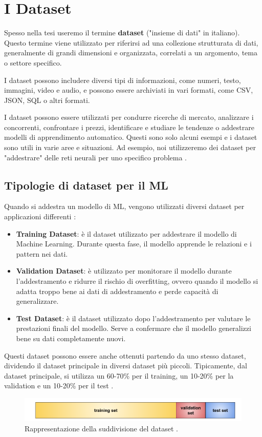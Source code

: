\section{I Dataset}
Spesso nella tesi useremo il termine \textbf{dataset} ("insieme di dati" in italiano). 
Questo termine viene utilizzato per riferirsi ad una collezione 
strutturata di dati, generalmente di grandi dimensioni e organizzata, correlati a 
un argomento, tema o settore specifico. 

I dataset possono includere diversi tipi di informazioni, come numeri, testo, 
immagini, video e audio, e possono essere archiviati in vari formati, 
come CSV, JSON, SQL o altri formati.

I dataset possono essere utilizzati per condurre ricerche di mercato, 
analizzare i concorrenti, confrontare i prezzi, identificare e studiare le 
tendenze o addestrare modelli di apprendimento automatico. Questi sono solo 
alcuni esempi e i dataset sono utili in varie aree e situazioni. Ad esempio, noi 
utilizzeremo dei dataset per "addestrare" delle reti neurali per uno specifico 
problema \cite{Dataset_Bright,Dataset_Wikipedia}.
\newpage
\subsection{Tipologie di dataset per il ML}
Quando si addestra un modello di ML, vengono utilizzati diversi dataset per 
applicazioni differenti \cite{UTILIZZI_DATASET}:

\begin{itemize}
    \item \textbf{Training Dataset}: è il dataset utilizzato per addestrare il 
    modello di Machine Learning. Durante questa fase, il modello apprende le 
    relazioni e i pattern nei dati.

    \item \textbf{Validation Dataset}: è utilizzato per monitorare il modello 
    durante l'addestramento e ridurre il rischio di overfitting, ovvero quando 
    il modello si adatta troppo bene ai dati di addestramento e 
    perde capacità di generalizzare.
    
    \item \textbf{Test Dataset}: è il dataset utilizzato dopo l'addestramento per 
    valutare le prestazioni finali del modello. Serve a confermare 
    che il modello generalizzi bene su dati completamente nuovi.
\end{itemize}

Questi dataset possono essere anche ottenuti partendo da uno stesso dataset, 
dividendo il dataset principale in diversi dataset più piccoli.
Tipicamente, dal dataset principale, si utilizza un 60-70\% per il training, un 10-20\% 
per la validation e un 10-20\% per il test \cite{DIVISIONE_DATASET,DIVISIONE_DATASET_2}.

\begin{figure}[H]
    \centering
    \includegraphics[width=1\textwidth]{Immagini/Generiche/PartitionThreeSets.png}
    \caption{Rappresentazione della suddivisione del dataset \cite{DIVISIONE_DATASET}.}
\end{figure}
